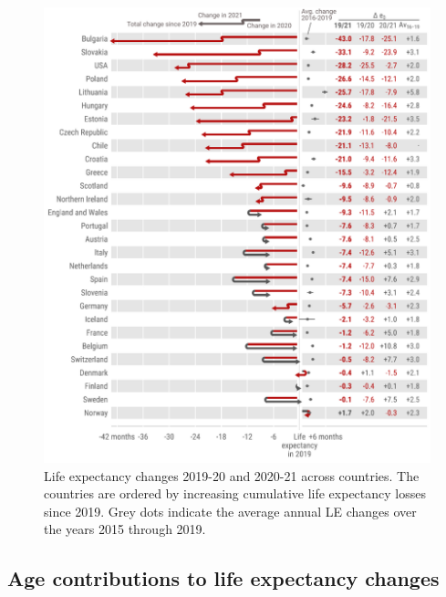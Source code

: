 \documentclass[12pt]{article}
\begin{document}
\begin{figure}[ht!]
    \centering
    \includegraphics{figure-1.pdf}
    \caption{Life expectancy changes 2019-20 and 2020-21 across countries. The countries are ordered by increasing cumulative life expectancy losses since 2019. Grey dots indicate the average annual LE changes over the years 2015 through 2019.}
    \label{fig:figure-1}
\end{figure}

\subsection*{Age contributions to life expectancy changes}
\end{document}
